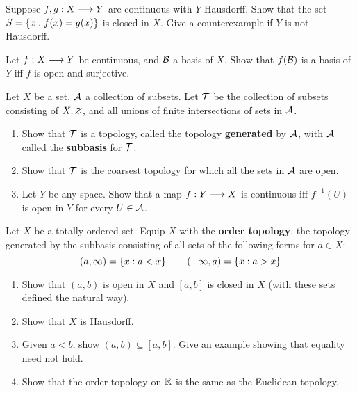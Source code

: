 \begin{exr}[source=Primary Source Material]
    Suppose $ f,g: X \longrightarrow Y $ are continuous with $ Y $ Hausdorff. Show that the
    set $ S = \left\{{x: f(x) = g(x)}\right\} $ is closed in $ X $. Give a counterexample if
    $ Y $ is not Hausdorff.
\end{exr}

\begin{exr}[source=Primary Source Material]
    Let $ f:X \longrightarrow Y $ be continuous, and $ \mathcal{B} $ a basis of $ X $.
    Show that $ f(\mathcal{B}) $ is a basis of $ Y $ iff $ f $ is open and surjective.
\end{exr}

\begin{exr}[source=Primary Source Material]
    Let $ X $ be a set, $ \mathcal{A} $ a collection of subsets. Let $ \mathcal{T} $ be
    the collection of subsets consisting of $ X, \varnothing $, and all unions of
    finite intersections of sets in $ \mathcal{A} $.
    \begin{enumerate}
        \item Show that $ \mathcal{T} $ is a topology, called the topology
            \textbf{generated} by $ \mathcal{A} $, with $ \mathcal{A} $ called the
            \textbf{subbasis} for $ \mathcal{T} $.
        \item Show that $ \mathcal{T} $ is the coarsest topology for which all the
            sets in $ \mathcal{A} $ are open.
        \item Let $ Y $ be any space. Show that a map $ f:Y \longrightarrow X $ is
            continuous iff $ f^{-1}(U) $ is open in $ Y $ for every $ U \in
            \mathcal{A} $.
    \end{enumerate}
\end{exr}

\begin{exr}[source=Primary Source Material]
    Let $ X $ be a totally ordered set. Equip $ X $ with the \textbf{order
    topology}, the topology generated by the subbasis consisting of all sets of
    the following forms for $ a \in X $:
    \begin{equation*}
        (a, \infty) = \left\{{x: a < x}\right\} \qquad (-\infty, a) = \left\{{x: a > x}\right\}
    \end{equation*}
    \begin{enumerate}
        \item Show that $ (a,b) $ is open in $ X $ and $ [a,b] $ is closed in
            $ X $ (with these sets defined the natural way).
        \item Show that $ X $ is Hausdorff.
        \item Given $ a < b $, show $ \bar{(a, b)} \subseteq [a,b] $. Give an
            example showing that equality need not hold.
        \item Show that the order topology on $ \mathbb{R} $ is the same as the
            Euclidean topology.
    \end{enumerate}
\end{exr}

